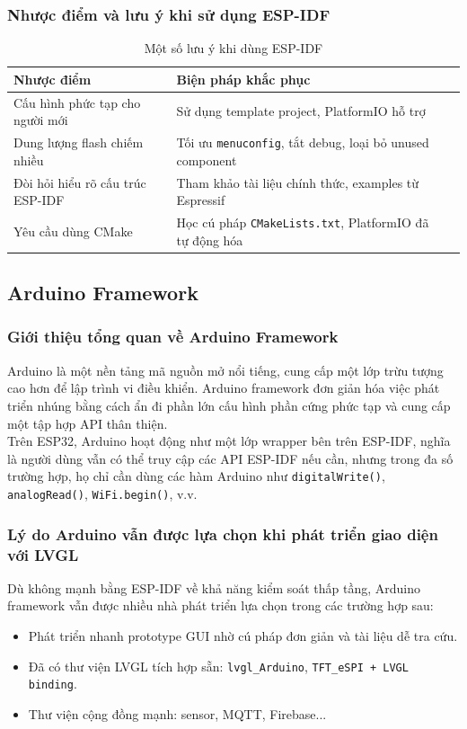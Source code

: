 \subsubsection{Nhược điểm và lưu ý khi sử dụng ESP-IDF}

\begin{table}[H]
\centering
\begin{tabular}{|l|p{6cm}|p{6cm}|}
\hline
\textbf{Nhược điểm} & \textbf{Biện pháp khắc phục} \\
\hline
Cấu hình phức tạp cho người mới & Sử dụng template project, PlatformIO hỗ trợ \\
Dung lượng flash chiếm nhiều & Tối ưu \texttt{menuconfig}, tắt debug, loại bỏ unused component \\
Đòi hỏi hiểu rõ cấu trúc ESP-IDF & Tham khảo tài liệu chính thức, examples từ Espressif \\
Yêu cầu dùng CMake & Học cú pháp \texttt{CMakeLists.txt}, PlatformIO đã tự động hóa \\
\hline
\end{tabular}
\caption{Một số lưu ý khi dùng ESP-IDF}
\end{table}

\subsection{Arduino Framework}

\subsubsection{Giới thiệu tổng quan về Arduino Framework}

Arduino là một nền tảng mã nguồn mở nổi tiếng, cung cấp một lớp trừu tượng cao hơn để lập trình vi điều khiển. Arduino framework đơn giản hóa việc phát triển nhúng bằng cách ẩn đi phần lớn cấu hình phần cứng phức tạp và cung cấp một tập hợp API thân thiện.\\
Trên ESP32, Arduino hoạt động như một lớp wrapper bên trên ESP-IDF, nghĩa là người dùng vẫn có thể truy cập các API ESP-IDF nếu cần, nhưng trong đa số trường hợp, họ chỉ cần dùng các hàm Arduino như \texttt{digitalWrite()}, \texttt{analogRead()}, \texttt{WiFi.begin()}, v.v.

\subsubsection{Lý do Arduino vẫn được lựa chọn khi phát triển giao diện với LVGL}
Dù không mạnh bằng ESP-IDF về khả năng kiểm soát thấp tầng, Arduino framework vẫn được nhiều nhà phát triển lựa chọn trong các trường hợp sau:
\begin{itemize}
    \item Phát triển nhanh prototype GUI nhờ cú pháp đơn giản và tài liệu dễ tra cứu.
    \item Đã có thư viện LVGL tích hợp sẵn: \texttt{lvgl\_Arduino}, \texttt{TFT\_eSPI + LVGL binding}.
    \item Thư viện cộng đồng mạnh: sensor, MQTT, Firebase...
\end{itemize}

